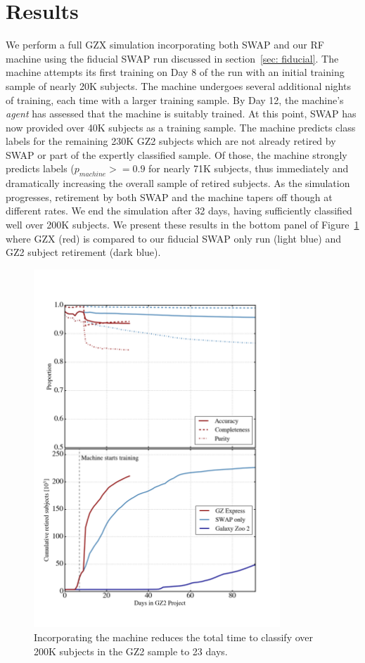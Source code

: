 \documentclass[twocolumn]{aastex6}
\begin{document}
\section{Results} \label{sec: results}
We perform a full GZX simulation incorporating both SWAP and our RF machine using the
 fiducial SWAP run discussed in section~\ref{sec: fiducial}. 
The machine attempts its first training on Day 8 of the run with an initial training
sample of nearly 20K subjects.  The machine undergoes several additional nights of training, 
each time with a larger training sample. 
By Day 12, the machine's \textit{agent} has assessed that the machine is suitably trained. 
At this point, SWAP has now provided over 40K subjects as a training sample. 
The machine predicts class labels for the remaining 230K GZ2 subjects which are not 
already retired by SWAP or part of the expertly classified sample. 
Of those, the machine strongly predicts labels ($p_{machine} >= 0.9$ for nearly 71K subjects, 
thus immediately and dramatically increasing the overall sample of retired subjects. 
As the simulation progresses, retirement by both SWAP and
the machine tapers off though at different rates. 
We end the simulation after 32 days, having sufficiently classified well over 200K subjects. 
We present these results in the bottom panel of Figure~\ref{fig: money} where GZX (red) 
is compared to our fiducial SWAP only run (light blue) and GZ2 subject retirement (dark blue). 

\begin{figure}[t!]
\includegraphics[width=3.65in]{figures/GZ2_sup_PLPD5_p5_flipfeature2b_RF_accuracy_redo_raw_combo_moneyplot.png}
\caption{Incorporating the machine reduces the total time to classify over 200K subjects in the GZ2 sample to 23 days. \label{fig: money}}
\end{figure}
\end{document}
